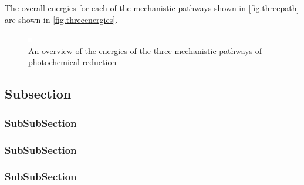 The overall energies for each of the mechanistic pathways shown in \autoref{fig.threepath} are shown in \autoref{fig.threeenergies}. 

\begin{figure}[!htbp]
 \begin{center}
  \includegraphics[clip=true]{images/insertgraphic.eps}
 \end{center}
\caption[Reaction energies for three mechanistic pathways]{An overview of the energies of the three mechanistic pathways of photochemical  reduction}
\label{fig.threeenergies}
\end{figure} 



\subsection{Subsection}

\subsubsection{SubSubSection}

\subsubsection{SubSubSection}

\subsubsection{SubSubSection}
